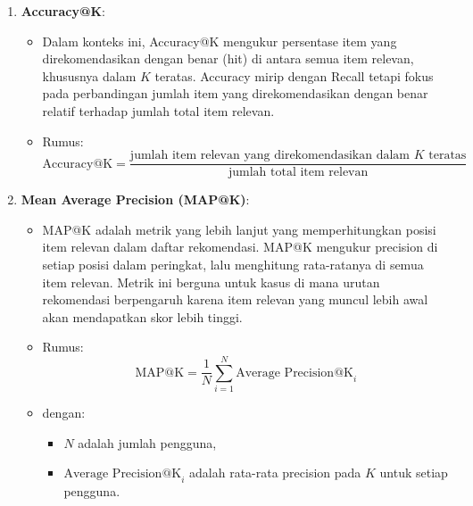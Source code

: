 \documentclass[journal,article,submit,pdftex,moreauthors]{Definitions/mdpi}
\begin{document}
\begin{enumerate}
    \item \textbf{Accuracy@K}:
    \begin{itemize}
        \item Dalam konteks ini, Accuracy@K mengukur persentase item yang direkomendasikan dengan benar (hit) di antara semua item relevan, khususnya dalam \( K \) teratas. Accuracy mirip dengan Recall tetapi fokus pada perbandingan jumlah item yang direkomendasikan dengan benar relatif terhadap jumlah total item relevan.
        \item Rumus:
        \[
        \text{Accuracy@K} = \frac{\text{jumlah item relevan yang direkomendasikan dalam } K \text{ teratas}}{\text{jumlah total item relevan}}
        \]
    \end{itemize}

    \item \textbf{Mean Average Precision (MAP@K)}:
    \begin{itemize}
        \item MAP@K adalah metrik yang lebih lanjut yang memperhitungkan posisi item relevan dalam daftar rekomendasi. MAP@K mengukur precision di setiap posisi dalam peringkat, lalu menghitung rata-ratanya di semua item relevan. Metrik ini berguna untuk kasus di mana urutan rekomendasi berpengaruh karena item relevan yang muncul lebih awal akan mendapatkan skor lebih tinggi.
        \item Rumus:
        \[
        \text{MAP@K} = \frac{1}{N} \sum_{i=1}^{N} \text{Average Precision@K}_{i}
        \]
        \item dengan:
        \begin{itemize}
            \item \( N \) adalah jumlah pengguna,
            \item \( \text{Average Precision@K}_{i} \) adalah rata-rata precision pada \( K \) untuk setiap pengguna.
        \end{itemize}
    \end{itemize}


\end{enumerate}
\end{document}
